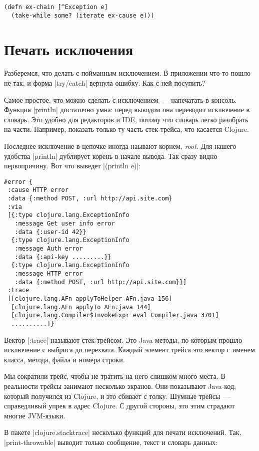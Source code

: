 \begin{verbatim}
(defn ex-chain [^Exception e]
  (take-while some? (iterate ex-cause e)))
\end{verbatim}

\section{Печать исключения}

Разберемся, что делать с пойманным исключением. В приложении что-то пошло не
так, и форма \spverb|try/catch| вернула ошибку. Как с ней посупить?

Самое простое, что можно сделать с исключением~--- напечатать в консоль. Функция
\spverb|println| достаточно умна: перед выводом она переводит исключение в
словарь. Это удобно для редакторов и IDE, потому что словарь легко разобрать на
части. Например, показать только ту часть стек-трейса, что касается Clojure.

Последнее исключение в цепочке иногда наывают корнем, \emph{root}. Для нашего
удобства \spverb|println| дублирует корень в начале вывода. Так сразу видно
первопричину. Вот что выведет \spverb|(println e)|:

\begin{verbatim}
#error {
 :cause HTTP error
 :data {:method POST, :url http://api.site.com}
 :via
 [{:type clojure.lang.ExceptionInfo
   :message Get user info error
   :data {:user-id 42}}
  {:type clojure.lang.ExceptionInfo
   :message Auth error
   :data {:api-key .........}}
  {:type clojure.lang.ExceptionInfo
   :message HTTP error
   :data {:method POST, :url http://api.site.com}}]
 :trace
 [[clojure.lang.AFn applyToHelper AFn.java 156]
  [clojure.lang.AFn applyTo AFn.java 144]
  [clojure.lang.Compiler$InvokeExpr eval Compiler.java 3701]
  ..........]}
\end{verbatim}

Вектор \spverb|:trace| называют стек-трейсом. Это Java-методы, по которым прошло
исключение с выброса до перехвата. Каждый элемент трейса это вектор с именем
класса, метода, файла и номера строки.

Мы сократили трейс, чтобы не тратить на него слишком много места. В реальности
трейсы занимают несколько экранов. Они показывают Java-код, который получился из
Clojure, и это сбивает с толку. Шумные трейсы~--- справедливый упрек в адрес
Clojure. С другой стороны, это этим страдают многие JVM-языки.

В пакете \spverb|clojure.stacktrace| несколько функций для печати
исключений. Так, \spverb|print-throwable| выводит только сообщение, текст
и словарь данных:

